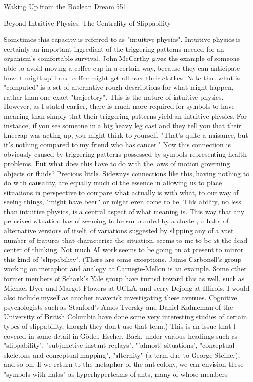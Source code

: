Waking Up from the Boolean Dream                                                       651

              Beyond Intuitive Physics: The Centrality of Slippability

        Sometimes this capacity is referred to as "intuitive physics". Intuitive physics
is certainly an important ingredient of the triggering patterns needed for an organism's
comfortable survival. John McCarthy gives the example of someone able to avoid
moving a coffee cup in a certain way, because they can anticipate how it might spill
and coffee might get all over their clothes. Note that what is "computed" is a set of
alternative rough descriptions for what might happen, rather than one exact
"trajectory". This is the nature of intuitive physics.
        However, as I stated earlier, there is much more required for symbols to have
meaning than simply that their triggering patterns yield an intuitive physics. For
instance, if you see someone in a big heavy leg cast and they tell you that their
kneecap was acting up, you might think to yourself, "That's quite a nuisance, but it's
nothing compared to my friend who has cancer." Now this connection is obviously
caused by triggering patterns possessed by symbols representing health problems. But
what does this have to do with the laws of motion governing objects or fluids?
Precious little. Sideways connections like this, having nothing to do with causality,
are equally much of the essence in allowing us to place situations in perspective to
compare what actually is with what, to our way of seeing things, "might have been" or
might even come to be. This ability, no less than intuitive physics, is a central aspect
of what meaning is.
        This way that any perceived situation has of seeming to be surrounded by a
cluster, a halo, of alternative versions of itself, of variations suggested by slipping any
of a vast number of features that characterize the situation, seems to me to be at the
dead center of thinking. Not much AI work seems to be going on at present to mirror
this kind of "slippability". (There are some exceptions. Jaime Carbonell's group
working on metaphor and analogy at Carnegie-Mellon is an example. Some other
former members of Schank's Yale group have turned toward this as well, such as
Michael Dyer and Margot Flowers at UCLA, and Jerry Dejong at Illinois. I would
also include myself as another maverick investigating these avenues. Cognitive
psychologists such as Stanford's Amos Tversky and Daniel Kahneman of the
University of British Columbia have done some very interesting studies of certain
types of slippability, though they don't use that term.) This is an issue that I covered in
some detail in Gödel, Escher, Bach, under various headings such as "slippability",
"subjunctive instant replays", "'almost' situations", "conceptual skeletons and
conceptual mapping", "alternity" (a term due to George Steiner), and so on.
        If we return to the metaphor of the ant colony, we can envision these "symbols
with halos" as hyperhyperteams of ants, many of whose members




